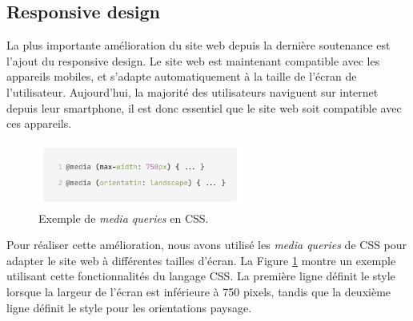 \subsection{Responsive design}

La plus importante amélioration du site web depuis la dernière soutenance est l'ajout du responsive design.
Le site web est maintenant compatible avec les appareils mobiles, et s'adapte automatiquement à la taille de l'écran de l'utilisateur.
Aujourd'hui, la majorité des utilisateurs naviguent sur internet depuis leur smartphone, il est donc essentiel que le site web soit compatible avec ces appareils.

\begin{figure}[H]
    \centering
    \includegraphics[width=0.6\textwidth]{assets/website2.png}
    \caption{Exemple de \textit{media queries} en CSS.}
    \label{fig:website2}
\end{figure}

Pour réaliser cette amélioration, nous avons utilisé les \textit{media queries} de CSS pour adapter le site web à différentes tailles d'écran.
La Figure \ref*{fig:website2} montre un exemple utilisant cette fonctionnalités du langage CSS.
La première ligne définit le style lorsque la largeur de l'écran est inférieure à 750 pixels, tandis que la deuxième ligne définit le style pour les orientations paysage.

